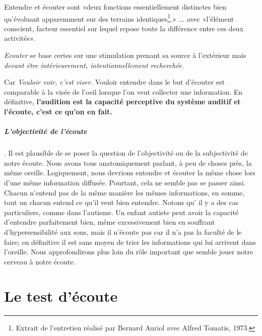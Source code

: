 Entendre et écouter sont «deux
fonctions essentiellement distinctes bien qu'évoluant apparemment sur
des terrains identiques\footnote{Extrait de l'entretien réalisé par
  Bernard Auriol avec Alfred Tomatis, 1973.}.» ... avec «l'élément conscient, facteur essentiel sur lequel repose toute la
différence entre ces deux activités».



\emph{Ecouter} se base certes sur une stimulation prenant sa source à
l'extérieur mais \emph{devant être intérieurement, intentionnellement
  recherchée}.





Car \emph{Vouloir voir, c'est viser.}  Vouloir entendre dans le but d'écouter est comparable  à
la visée de l'oeil lorsque l'on veut collecter une information.  
En définitive,\textbf{ l'audition est la capacité perceptive du système auditif et l'écoute, c'est ce qu'on en fait.}


\subparagraph{L'objectivité de l'écoute}.
Il est plausible de se poser la question de
l'objectivité ou de la subjectivité de notre écoute. Nous avons tous
anatomiquement parlant, à peu de choses près, la même
oreille. Logiquement, nous devrions entendre et écouter la même chose
lors d'une même information diffusée. Pourtant, cela ne semble pas se
passer ainsi. Chacun n'entend pas de la même manière les mêmes
informations, en somme, tout un chacun entend ce qu'il veut bien
entendre. 
Notons qu' il y a des cas particuliers, comme dans l'autisme. Un enfant autiste peut avoir la capacité d'entendre 
parfaitement bien, même excessivement bien en souffrant d'hypersensibilité aux sons, mais il n'écoute pas car il n'a pas la faculté de le faire; en définitive il est sans moyen de trier les informations qui lui arrivent dans l'oreille. 
Nous approfondirons plus loin du rôle important que semble jouer notre cerveau à notre
écoute.



\section{Le test d'écoute} %

